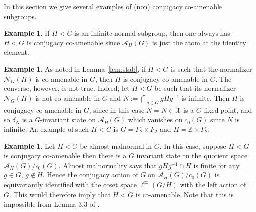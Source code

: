 \documentclass[11pt]{amsart}
\theoremstyle{definition}
\newtheorem{examp}[thm]{Example}
\begin{document}
In this section we give several examples of (non) conjugacy co-amenable subgroups.

\begin{examp}
If $H<G$ is an infinite normal subgroup, then one always has $H<G$ is conjugacy co-amenable since $\mathcal{A}_H(G)$ is just the atom at the identity element. 
\end{examp}



\begin{examp} \label{normalizer example}
As noted in Lemma~\ref{lem:stab}, if $H<G$ is such that the normalizer $\mathcal{N}_G(H)$ is co-amenable in $G$, then $H$ is conjugacy co-amenable in $G$. The converse, however, is not true. Indeed, let $H<G$ be such that its normalizer $\mathcal{N}_G(H)$ is not co-amenable in $G$ and $N:=\bigcap_{g\in G}gHg^{-1}$ is infinite. Then $H$ is conjugacy co-amenable in $G$, since in this case $\widetilde{N}=N\in \widetilde{\mathcal{X}}$ is a $G$-fixed point, and so $\delta_N$ is a $G$-invariant state on $\mathcal{A}_H(G)$ which vanishes on $c_0(G)$ since $N$ is infinite.  
%
An example of such $H<G$ is
$G = F_2\times F_2$ and $H=\mathbb{Z}\times F_2$. 
\end{examp}

\begin{examp} Let $H<G$ be almost malnormal in $G$. In this case, suppose $H<G$ is conjugacy co-amenable then there is a $G$ invariant state on the quotient space $\mathcal{A}_H(G)/c_0(G)$. Almost malnormality says that $gHg^{-1}\cap H$ is finite for any $g\in G$, $g\notin H$. Hence the conjugacy action of $G$ on $\mathcal{A}_H(G)/c_0(G)$ is equivariantly identified with the coset space $\ell^\infty(G/H)$ with the left action of $G$. This would therefore imply that $H<G$ is co-amenable. Note that this is impossible from Lemma 3.3 of \cite{TDDuke}.
\end{examp}
\end{document}
